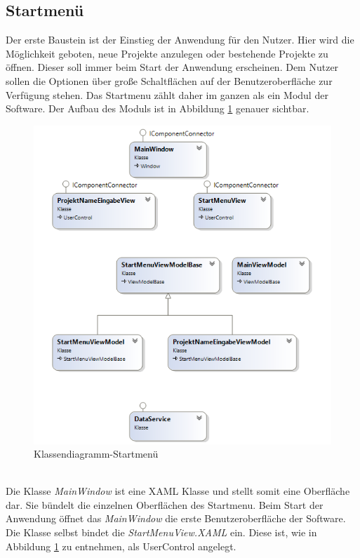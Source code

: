 \subsection{Startmenü}
Der erste Baustein ist der Einstieg der Anwendung für den Nutzer. Hier wird die Möglichkeit geboten, neue Projekte anzulegen oder bestehende 
Projekte zu öffnen. Dieser soll immer beim Start der Anwendung erscheinen. Dem Nutzer sollen die Optionen über große Schaltflächen auf der 
Benutzeroberfläche zur Verfügung stehen. Das Startmenu zählt daher im ganzen als ein Modul der Software. Der Aufbau des Moduls ist in 
Abbildung \ref{pic:klassendiagramStartmenu} genauer sichtbar. 
\\
\begin{figure}[hbt!]
    \centering
    \includegraphics{4Systementwurf/Bilder/klassendiagramStartmenu}
    \caption{Klassendiagramm-Startmenü}
    \label{pic:klassendiagramStartmenu}
\end{figure}
\\ Die Klasse \textit{MainWindow} ist eine XAML Klasse und stellt somit eine Oberfläche dar. Sie bündelt die einzelnen Oberflächen des 
Startmenu. Beim Start der Anwendung öffnet das \textit{MainWindow} die erste Benutzeroberfläche der Software. Die Klasse selbst bindet 
die \textit{StartMenuView.XAML} ein. Diese ist, wie in Abbildung \ref{pic:klassendiagramStartmenu} zu entnehmen, als UserControl angelegt. 
